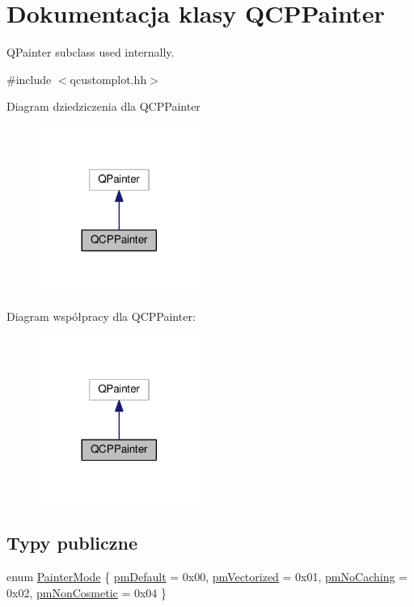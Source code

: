 \hypertarget{class_q_c_p_painter}{}\section{Dokumentacja klasy Q\+C\+P\+Painter}
\label{class_q_c_p_painter}


Q\+Painter subclass used internally.  




{\ttfamily \#include $<$qcustomplot.\+hh$>$}



Diagram dziedziczenia dla Q\+C\+P\+Painter\nopagebreak
\begin{figure}[H]
\begin{center}
\leavevmode
\includegraphics[width=149pt]{class_q_c_p_painter__inherit__graph}
\end{center}
\end{figure}


Diagram współpracy dla Q\+C\+P\+Painter\+:\nopagebreak
\begin{figure}[H]
\begin{center}
\leavevmode
\includegraphics[width=149pt]{class_q_c_p_painter__coll__graph}
\end{center}
\end{figure}
\subsection*{Typy publiczne}
\begin{DoxyCompactItemize}
\item 
enum \hyperlink{class_q_c_p_painter_a156cf16444ff5e0d81a73c615fdb156d}{Painter\+Mode} \{ \hyperlink{class_q_c_p_painter_a156cf16444ff5e0d81a73c615fdb156da3bac5e87e3d58553b297befb4eee2a45}{pm\+Default} = 0x00, 
\hyperlink{class_q_c_p_painter_a156cf16444ff5e0d81a73c615fdb156daeda679cd55dcd468341d07d48a30b6ab}{pm\+Vectorized} = 0x01, 
\hyperlink{class_q_c_p_painter_a156cf16444ff5e0d81a73c615fdb156dae78f9a4eb277a5f9207f50850a51a0b0}{pm\+No\+Caching} = 0x02, 
\hyperlink{class_q_c_p_painter_a156cf16444ff5e0d81a73c615fdb156dac1e481bfaf408f2bd2eaad3ec341f36b}{pm\+Non\+Cosmetic} = 0x04
 \}
\end{DoxyCompactItemize}
